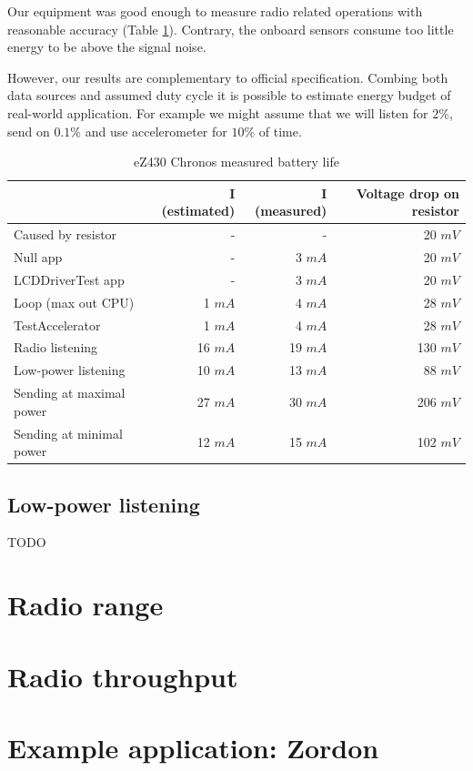 Our equipment was good enough to measure radio related operations with reasonable accuracy (Table \ref{tab:power-usage}).
Contrary, the onboard sensors consume too little energy to be above the signal noise.

However, our results are complementary to official specification.
Combing both data sources and assumed duty cycle it is possible to estimate energy budget of real-world application.
For example we might assume that we will listen for $2 \%$, send on $ 0.1 \% $ and use accelerometer for $ 10 \% $ of time.

\begin{table}[h]
  \centering
    \begin{tabular}{|l|r|r|r|}
        \hline
              & \textbf{I (estimated)} & \textbf{I (measured)}          & \textbf{Voltage drop on resistor}  \\ \hline
Caused by resistor & - & - & 20 $ mV $ \\ \hline
Null app    & - & 3 $ mA $          & 20 $ mV $  \\ \hline
LCDDriverTest app    & - & 3 $ mA $ & 20 $ mV $  \\ \hline
Loop (max out CPU)    & 1 $ mA $ & 4 $ mA $          & 28 $ mV $  \\ \hline
TestAccelerator     & 1 $ mA $ & 4 $ mA $          & 28 $ mV $  \\ \hline
Radio listening     & 16 $ mA $ & 19 $ mA $   & 130 $ mV $  \\ \hline
Low-power listening     & 10 $ mA $ & 13 $ mA $              & 88 $ mV $  \\ \hline
Sending at maximal power     & 27 $ mA $ & 30 $ mA $              & 206 $ mV $  \\ \hline
Sending at minimal power      & 12 $ mA $ & 15 $ mA $            & 102 $ mV $  \\ \hline

    \end{tabular}
  \caption{eZ430 Chronos measured battery life}
  \label{tab:power-usage}
\end{table}

\subsection{Low-power listening}

TODO



\section{Radio range}




\section{Radio throughput}



\section{Example application: Zordon}





